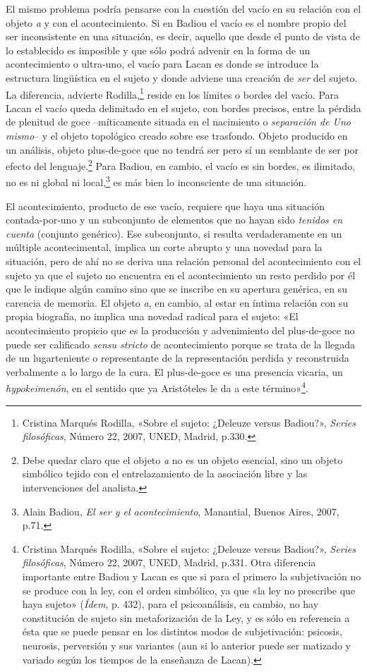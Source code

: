 El mismo problema podría pensarse con la cuestión del vacío en su relación con el objeto \emph{a} y con el acontecimiento. Si en Badiou el vacío es el nombre propio del ser inconsistente en una situación, es decir, aquello que desde el punto de vista de lo establecido es imposible y que sólo podrá advenir en la forma de un acontecimiento o ultra-uno, el vacío para Lacan es donde se introduce la estructura lingüística en el sujeto y donde adviene una creación de \emph{ser} del sujeto. La diferencia, advierte Rodilla,\footnote{Cristina Marqués Rodilla, «Sobre el sujeto: ¿Deleuze versus Badiou?», \emph{Series filosóficas}, Número 22, 2007, UNED, Madrid, p.330.} reside en los límites o bordes del vacío. Para Lacan el vacío queda delimitado en el sujeto, con bordes precisos, entre la pérdida de plenitud de goce --míticamente situada en el nacimiento o \emph{separación de Uno mismo}-- y el objeto topológico creado sobre ese trasfondo. Objeto producido en un análisis, objeto plus-de-goce que no tendrá ser pero sí un semblante de ser por efecto del lenguaje.\footnote{Debe quedar claro que el objeto \emph{a} no es un objeto esencial, sino un objeto simbólico tejido con el entrelazamiento de la asociación libre y las intervenciones del analista.} Para Badiou, en cambio, el vacío es sin bordes, es ilimitado, no es ni global ni local,\footnote{Alain Badiou, \emph{El ser y el acontecimiento}, Manantial, Buenos Aires, 2007, p.71.} es más bien lo inconsciente de una situación.

El acontecimiento, producto de ese vacío, requiere que haya una situación contada-por-uno y un subconjunto de elementos que no hayan sido \emph{tenidos en cuenta} (conjunto genérico). Ese subconjunto, si resulta verdaderamente en un múltiple acontecimental, implica un corte abrupto y una novedad para la situación, pero de ahí no se deriva una relación personal del acontecimiento con el sujeto ya que el sujeto no encuentra en el acontecimiento un resto perdido por él que le indique algún camino sino que se inscribe en su apertura genérica, en su carencia de memoria. El objeto \emph{a}, en cambio, al estar en íntima relación con su propia biografía, no implica una novedad radical para el sujeto: «El acontecimiento propicio que es la producción y advenimiento del plus-de-goce no puede ser calificado \emph{sensu stricto} de acontecimiento porque se trata de la llegada de un lugarteniente o representante de la representación perdida y reconstruida verbalmente a lo largo de la cura. El plus-de-goce es una presencia vicaria, un \emph{hypokeimenón}, en el sentido que ya Aristóteles le da a este término»\footnote{Cristina Marqués Rodilla, «Sobre el sujeto: ¿Deleuze versus Badiou?», \emph{Series filosóficas}, Número 22, 2007, UNED, Madrid, p.331. Otra diferencia importante entre Badiou y Lacan es que si para el primero la subjetivación no se produce con la ley, con el orden simbólico, ya que «la ley no prescribe que haya sujeto» (\emph{Ídem}, p. 432), para el psicoanálisis, en cambio, no hay constitución de sujeto sin metaforización de la Ley, y es sólo en referencia a ésta que se puede pensar en los distintos modos de subjetivación: psicosis, neurosis, perversión y sus variantes (aun si lo anterior puede ser matizado y variado según los tiempos de la enseñanza de Lacan).}.


